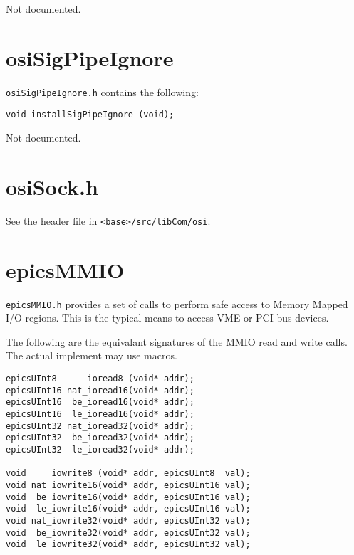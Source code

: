 Not documented.

\section{osiSigPipeIgnore}

\verb|osiSigPipeIgnore.h| contains the following:

\begin{verbatim}
void installSigPipeIgnore (void);
\end{verbatim}

Not documented.

\section{osiSock.h}

See the header file in \verb|<base>/src/libCom/osi|.

\section{epicsMMIO}

\verb|epicsMMIO.h| provides a set of calls to perform safe access to Memory Mapped I/O regions.
This is the typical means to access VME or PCI bus devices.

The following are the equivalant signatures of the MMIO read and write calls.
The actual implement may use macros.

\begin{verbatim}
epicsUInt8      ioread8 (void* addr);
epicsUInt16 nat_ioread16(void* addr);
epicsUInt16  be_ioread16(void* addr);
epicsUInt16  le_ioread16(void* addr);
epicsUInt32 nat_ioread32(void* addr);
epicsUInt32  be_ioread32(void* addr);
epicsUInt32  le_ioread32(void* addr);

void     iowrite8 (void* addr, epicsUInt8  val);
void nat_iowrite16(void* addr, epicsUInt16 val);
void  be_iowrite16(void* addr, epicsUInt16 val);
void  le_iowrite16(void* addr, epicsUInt16 val);
void nat_iowrite32(void* addr, epicsUInt32 val);
void  be_iowrite32(void* addr, epicsUInt32 val);
void  le_iowrite32(void* addr, epicsUInt32 val);
\end{verbatim}

